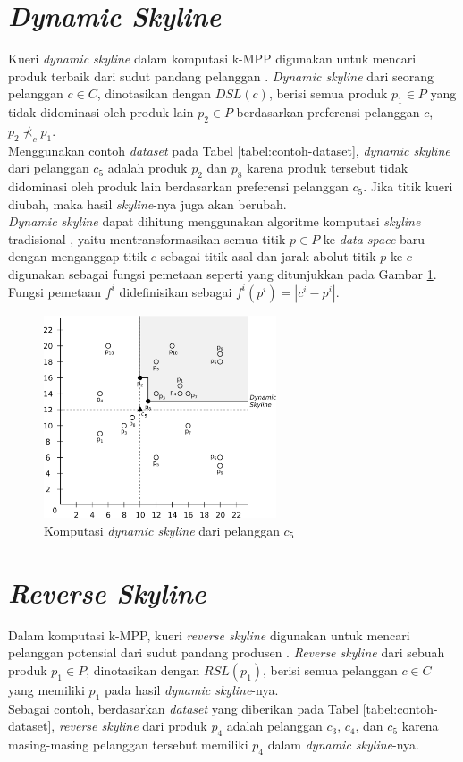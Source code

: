 \section{\textit{Dynamic Skyline}}
\tab Kueri \textit{dynamic skyline} dalam komputasi k-MPP digunakan untuk mencari produk terbaik dari sudut pandang pelanggan \cite{kmpp}. \textit{Dynamic skyline} \cite{dynamic-skyline} dari seorang pelanggan $c \in C$, dinotasikan dengan $DSL(c)$, berisi semua produk $p_1 \in P$ yang tidak didominasi oleh produk lain $p_2 \in P$ berdasarkan preferensi pelanggan $c$, $p_2 \nprec_c p_1$.\\
\tab Menggunakan contoh \textit{dataset} pada Tabel \ref{tabel:contoh-dataset}, \textit{dynamic skyline} dari pelanggan $c_5$ adalah produk $p_2$ dan $p_8$ karena produk tersebut tidak didominasi oleh produk lain berdasarkan preferensi pelanggan $c_5$. Jika titik kueri diubah, maka hasil \textit{skyline}-nya juga akan berubah.\\
\tab \textit{Dynamic skyline} dapat dihitung menggunakan algoritme komputasi \textit{skyline} tradisional \cite{skyline}, yaitu mentransformasikan semua titik $p \in P$ ke \textit{data space} baru dengan menganggap titik $c$ sebagai titik asal dan jarak abolut titik $p$ ke $c$ digunakan sebagai fungsi pemetaan seperti yang ditunjukkan pada Gambar \ref{figure:cnt-dsl}. Fungsi pemetaan $f^i$ didefinisikan sebagai $f^i (p^i) = |c^i-p^i|$.

\begin{figure}[H]
	\centerline {
		\includegraphics[height=6cm]{bab2/img/dsl.png}
	}
	\caption{Komputasi \textit{dynamic skyline} dari pelanggan $c_5$}
	\label{figure:cnt-dsl}
\end{figure}

\section{\textit{Reverse Skyline}}
\tab Dalam komputasi k-MPP, kueri \textit{reverse skyline} digunakan untuk mencari pelanggan potensial dari sudut pandang produsen \cite{kmpp}. \textit{Reverse skyline} \cite{reverse-skyline} dari sebuah produk $p_1 \in
P$, dinotasikan dengan $RSL(p_1)$, berisi semua pelanggan $c \in C$ yang memiliki $p_1$ pada hasil \textit{dynamic skyline}-nya.\\
\tab Sebagai contoh, berdasarkan \textit{dataset} yang diberikan pada Tabel \ref{tabel:contoh-dataset}, \textit{reverse skyline} dari produk $p_4$ adalah pelanggan $c_3$, $c_4$, dan $c_5$ karena masing-masing pelanggan tersebut memiliki $p_4$ dalam \textit{dynamic skyline}-nya.\\

